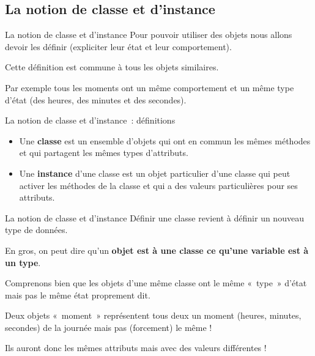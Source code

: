 \subsection{La notion de classe et d'instance}

\begin{frame}{La notion de classe et d'instance}
	Pour pouvoir utiliser des objets nous allons devoir les définir
	(expliciter leur état et leur comportement). 
	
	Cette définition est commune à tous les objets similaires. 
	
	\bigskip
	
	Par exemple tous les moments ont un même comportement 
	et un même type d'état 
	(des heures, des minutes et des secondes).
\end{frame}

\begin{frame}{La notion de classe et d'instance~: définitions}
	\begin{itemize}
	\item
		Une \textbf{classe} est un ensemble d'objets qui ont en
		commun les mêmes méthodes et qui partagent les mêmes types
		d'attributs.
	
	\bigskip
	
	\item
		Une \textbf{instance}
		d'une classe est un objet particulier
		d'une classe qui peut activer les méthodes de la
		classe et qui a des valeurs particulières pour ses attributs.
	\end{itemize}
\end{frame}

\begin{frame}{La notion de classe et d'instance}
	Définir une classe revient à définir un nouveau type de
	données. 
	
	\bigskip
	
	En gros, on peut dire qu'un \textbf{objet
	est à une classe ce qu'une variable est à un type}.
	
	\bigskip
	
	Comprenons bien que les objets d'une même classe ont le
	même «~type~» d'état mais pas le même état proprement
	dit. 
	
	Deux objets «~moment~» représentent tous deux un moment 
	(heures, minutes, secondes) de la journée mais pas (forcement) 
	le même ! 
	
	Ils auront donc les mêmes attributs mais
	avec des valeurs différentes !
\end{frame}

